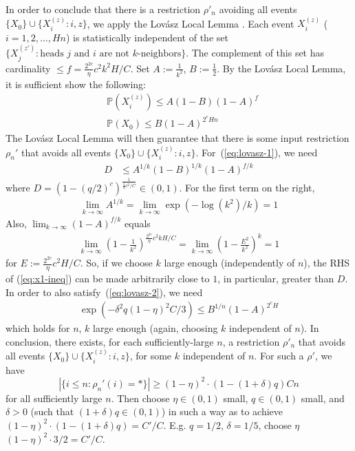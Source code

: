 \documentclass[11pt,a4paper]{article}
\newcommand{\Prob}{\mathbb{P}}%
\begin{document}
In order to conclude that there is a restriction $\rho'_n$ avoiding all events $\{X_0\} \cup \{X_i^{(z)} : i, z\}$, we apply the Lov{\'a}sz Local Lemma \cite[Theorem 6.17]{mitzenmacherprobability}.
Each event $X_i^{(z)}$ ($i=1,2,\dots, Hn$) is statistically independent of the set $\{X_j^{(z')} : \text{heads } j \text{ and } i \text{ are not $k$-neighbors}\}$.
The complement of this set has cardinality $\leq f= \frac{2^{2c}}{\eta}c^2k^2H/C$.
Set $A:=\frac{1}{k^2}$, $B:=\frac{1}{2}$.
By the Lov{\'a}sz Local Lemma, it is sufficient show the following: %
\begin{align}\label{eq:lovasz-1}
&\Prob(X_i^{(z)}) \leq A(1-B)(1-A)^{f} \\ \label{eq:lovasz-2}
&\Prob(X_0)  \leq B (1-A)^{2^cHn}
\end{align}
The Lov{\'a}sz Local Lemma will then guarantee that there is some input restriction $\rho_n'$ that avoids all events $\{X_0\} \cup \{X_i^{(z)} : i, z\}$.
For~(\ref{eq:lovasz-1}), we need
\begin{align}\label{eq:x1-ineq}
    D &\leq A^{1/k}(1-B)^{1/k}(1-A)^{f/k} 
\end{align}
where $D =  \left(1-(q/2)^c\right)^{\frac{1}{\frac{1}{\eta}c^2/C}} \in (0,1)$.
For the first term on the right, 
\begin{align*}
\lim_{k\rightarrow \infty} A^{1/k} = \lim_{k\rightarrow \infty} \exp\left(-\log(k^2) / k\right) = 1
\end{align*}
Also, $\lim_{k\rightarrow \infty} (1-A)^{f/k}$ equals
\begin{align*}
\lim_{k\rightarrow \infty} \left(1-\frac{1}{k^2}\right)^{\frac{2^{2c}}{\eta}c^2kH/C} = \lim_{k\rightarrow \infty} \left(1-\frac{E^2}{k^2}\right)^{k} = 1
\end{align*}
for $E := \frac{2^{2c}}{\eta}c^2H/C$. So, if we choose $k$ large enough (independently of $n$), the RHS of (\ref{eq:x1-ineq}) can be made arbitrarily close to $1$, in particular, greater than $D$.
In order to also satisfy~(\ref{eq:lovasz-2}), we need
\begin{align*}
\exp\left(-\delta^2q(1-\eta)^2C/3\right)  \leq B^{1/n} (1-A)^{2^c H}
\end{align*}
which holds for $n$, $k$ large enough (again, choosing $k$ independent of $n$). 
In conclusion, there exists, for each sufficiently-large $n$, a restriction $\rho'_n$ that avoids all events $\{X_0\} \cup \{X_i^{(z)} : i, z\}$, for some $k$ independent of $n$.
For such a $\rho'$, we have
\begin{equation*}
|\{i \leq n: \rho_n'(i) = *\}|\geq (1-\eta)^2\cdot (1-(1+\delta)q) C n
\end{equation*}
for all sufficiently large $n$.
Then choose $\eta \in (0,1)$ small, $q \in (0,1)$ small, and $\delta >0$ (such that $(1+\delta)q \in (0,1)$) in such a way as to achieve $(1-\eta)^2\cdot (1-(1+\delta)q) = C'/C$.
E.g. $q=1/2$, $\delta=1/5$, choose $\eta$
$(1-\eta)^2\cdot 3/2 = C'/C$.
\end{document}
